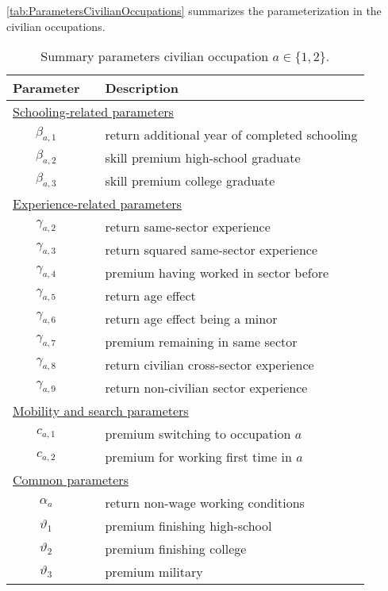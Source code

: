 
\autoref{tab:ParametersCivilianOccupations} summarizes the parameterization in the civilian occupations.
\begin{table}[h]
\caption{Summary parameters civilian occupation $a \in \{1,2\}$.}
\label{tab:ParametersCivilianOccupations}
\vspace{5pt}
\centering
\setlength\extrarowheight{2.5pt}
\begin{tabular}{@{}cll@{}}
\toprule
Parameter            &  &  \multicolumn{1}{l}{Description}              \\ \midrule
\multicolumn{3}{l}{\underline{Schooling-related parameters}}            \\[5pt]
$\beta_{a,1}$        &  & return additional year of completed schooling \\
$\beta_{a,2}$        &  & skill premium high-school graduate            \\
$\beta_{a,3}$        &  & skill premium college graduate                \\[7.5pt]
\multicolumn{3}{l}{\underline{Experience-related parameters}}           \\[5pt]
$\gamma_{a,2}$       &  & return same-sector experience                 \\
$\gamma_{a,3}$       &  & return squared same-sector experience         \\
$\gamma_{a,4}$       &  & premium having worked in sector before        \\
$\gamma_{a,5}$       &  & return age effect                             \\
$\gamma_{a,6}$       &  & return age effect being a minor               \\
$\gamma_{a,7}$       &  & premium remaining in same sector              \\
$\gamma_{a,8}$       &  & return civilian cross-sector experience       \\
$\gamma_{a,9}$       &  & return non-civilian sector experience         \\[7.5pt]
\multicolumn{3}{l}{\underline{Mobility and search parameters}}          \\[5pt]
$c_{a,1}$            &  & premium switching to occupation $a$           \\
$c_{a,2}$            &  & premium for working first time in $a$         \\[7.5pt]
\multicolumn{3}{l}{\underline{Common parameters}}                    \\[5pt]
$\alpha_a$           &  & return non-wage working conditions            \\
$\vartheta_1$        &  & premium finishing high-school                 \\
$\vartheta_2$        &  & premium finishing college                     \\
$\vartheta_3$        &  & premium military                              \\[7.5pt]
\bottomrule
\end{tabular}
\end{table}
